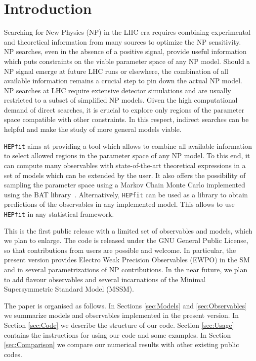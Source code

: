 \documentclass[preprint,3p,12pt]{elsarticle}
\newcommand{\HEPfit}{\texttt{HEPfit}\xspace}
\begin{document}
\section{Introduction}

Searching for New Physics (NP) in the LHC era requires combining
experimental and theoretical information from many sources to optimize
the NP sensitivity. NP searches, even in the absence of a positive
signal, provide useful information which puts constraints on the
viable parameter space of any NP model. Should a NP signal emerge at
future LHC runs or elsewhere, the combination of all available
information remains a crucial step to pin down the actual NP model.
NP searches at LHC require extensive detector simulations and are
usually restricted to a subset of simplified NP models. Given the high
computational demand of direct searches, it is crucial to explore only
regions of the parameter space compatible with other constraints. In
this respect, indirect searches can be helpful and make the study of
more general models viable.

\HEPfit aims at providing a tool which allows to combine all
available information to select allowed regions in the parameter space
of any NP model. To this end, it can compute many observables with
state-of-the-art theoretical expressions in a set of models which can
be extended by the user. It also offers the possibility of sampling
the parameter space using a Markov Chain Monte Carlo implemented using
the BAT library~\cite{arXiv:0808.2552}. Alternatively, \HEPfit can be
used as a library to obtain predictions of the observables in any
implemented model. This allows to use \HEPfit in any statistical
framework.

This is the first public release with a limited set of observables and
models, which we plan to enlarge. The code is released under the GNU
General Public License, so that contributions from users are possible
and welcome. In particular, the present version provides Electro Weak
Precision Observables (EWPO) in the SM and in several parametrizations
of NP contributions. In the near future, we plan to add flavour
observables and several incarnations of the Minimal Supersymmetric
Standard Model (MSSM).

The paper is organised as follows. In Sections \ref{sec:Models} and \ref{sec:Observables} we
summarize models and observables implemented in the present
version. In Section \ref{sec:Code} we describe the structure of our
code. Section \ref{sec:Usage} contains the instructions for using our
code and some examples. In Section \ref{sec:Comparison} we compare our
numerical results with other existing public codes.
\end{document}
